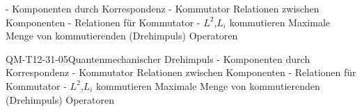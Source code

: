 - Komponenten durch Korrespondenz
- Kommutator Relationen zwischen Komponenten
- Relationen für Kommutator
- $L^2$,$L_i$ kommutieren
Maximale Menge von kommutierenden (Drehimpuls) Operatoren

\begin{REM}{QM-T12-31-05}{Quantenmechanischer Drehimpuls
- Komponenten durch Korrespondenz
- Kommutator Relationen zwischen Komponenten
- Relationen für Kommutator
- $L^2$,$L_i$ kommutieren
Maximale Menge von kommutierenden (Drehimpuls) Operatoren}
\end{REM}
